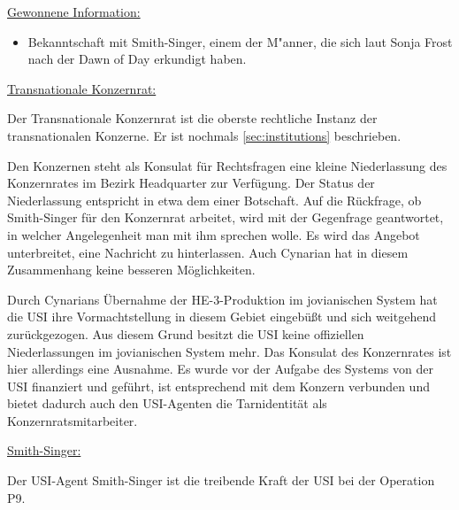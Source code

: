 \begin{remarks}
	\underline{Gewonnene Information:}
	
	\begin{itemize}
		\item Bekanntschaft mit Smith-Singer, einem der M"anner, die sich laut Sonja Frost nach der Dawn of Day erkundigt haben.
	\end{itemize}

	\underline{Transnationale Konzernrat:}

	Der Transnationale Konzernrat ist die oberste rechtliche Instanz der transnationalen Konzerne. Er ist nochmals \cref{sec:institutions} beschrieben.

	Den Konzernen steht als Konsulat für Rechtsfragen eine kleine Niederlassung des Konzernrates im Bezirk Headquarter zur Verfügung. Der Status der Niederlassung entspricht in etwa dem einer Botschaft. Auf die Rückfrage, ob Smith-Singer für den Konzernrat arbeitet, wird mit der Gegenfrage geantwortet, in welcher Angelegenheit man mit ihm sprechen wolle. Es wird das Angebot unterbreitet, eine Nachricht zu hinterlassen. Auch Cynarian hat in diesem Zusammenhang keine besseren Möglichkeiten.
	
	Durch Cynarians Übernahme der HE-3-Produktion im jovianischen System hat die USI ihre Vormachtstellung in diesem Gebiet eingebüßt und sich weitgehend zurückgezogen. Aus diesem Grund besitzt die USI keine offiziellen Niederlassungen im jovianischen System mehr. Das Konsulat des Konzernrates ist hier allerdings eine Ausnahme. Es wurde vor der Aufgabe des Systems von der USI finanziert und geführt, ist entsprechend mit dem Konzern verbunden und bietet dadurch auch den USI-Agenten die Tarnidentität als Konzernratsmitarbeiter.

	\underline{Smith-Singer:}

	Der USI-Agent Smith-Singer ist die treibende Kraft der USI bei der Operation P9.
\end{remarks}
